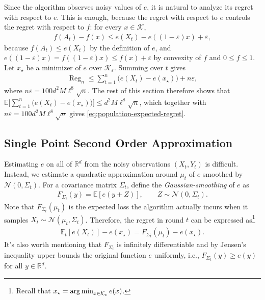 \documentclass[12pt,cleveref]{jmlr}
\newcommand{\R}{\mathbb R}
\newcommand{\E}{\mathbb E}
\newcommand{\K}{\mathcal K}
\newcommand{\N}{\mathcal N}
\newcommand{\argmin}{\operatornamewithlimits{arg\,min}}
\newcommand{\1}{\mathbf 1}
\newcommand{\eps}{\varepsilon}
\begin{document}
Since the algorithm observes noisy values of $e$, it is natural to analyze its regret with respect to $e$.
This is enough, because the regret with respect to $e$ controls the regret with respect to $f$:
for every $x\in\K$,
\begin{align}
    f(A_t)-f(x)
    \leq e(X_t)-e((1-\eps)x)+\eps,
\end{align}
because $f(A_t)\leq e(X_t)$ by the definition of $e$, and $e((1-\eps)x)=f((1-\eps)x)\leq f(x)+\eps$ by convexity of $f$ and $0\leq f\leq1$.
Let $x_\star$ be a minimizer of $e$ over $\K_\eps$.
Summing over $t$ gives
\begin{align}
    \operatorname{Reg}_n
    \leq\sum_{t=1}^n\bigl(e(X_t)-e(x_\star)\bigr)+n\eps,
\end{align}
where $n\eps=100d^2M\ell^8\sqrt n$.
The rest of this section therefore shows that $\E\bigl[\sum_{t=1}^n\bigl(e(X_t)-e(x_\star)\bigr)\bigr]\leq d^2M\ell^8\sqrt n$, which together with $n\eps=100d^2M\ell^8\sqrt n$ gives \cref{eq:population-expected-regret}.

\subsection{Single Point Second Order Approximation}
\label{sec:quadratic-approximation}
Estimating $e$ on all of $\R^d$ from the noisy observations $(X_t,Y_t)$ is difficult.
Instead, we estimate a quadratic approximation around $\mu_t$ of $e$ smoothed by $\N(0,\Sigma_t)$.
For a covariance matrix $\Sigma_t$, define the \textit{Gaussian-smoothing} of $e$ as
\begin{align}
    F_{\Sigma_t}(y)
    =\E[e(y+Z)],\qquad Z\sim\N(0,\Sigma_t).
\end{align}
Note that $F_{\Sigma_t}(\mu_t)$ is the expected loss the algorithm actually incurs when it samples $X_t \sim \N(\mu_t, \Sigma_t)$.
Therefore, the regret in round $t$ can be expressed as\footnote{Recall that $x_\star = \argmin_{x \in \mathcal{K}_\eps}e(x)$.}
\begin{align}
    \E_t[e(X_t)]-e(x_\star)
    = F_{\Sigma_t}(\mu_t) - e(x_\star).
\end{align}
It's also worth mentioning that $F_{\Sigma_t}$ is infinitely differentiable and by Jensen's inequality upper bounds the original function $e$ uniformly, i.e., $F_{\Sigma_t}(y) \ge e(y)$ for all $y \in \R^d$.
\end{document}
